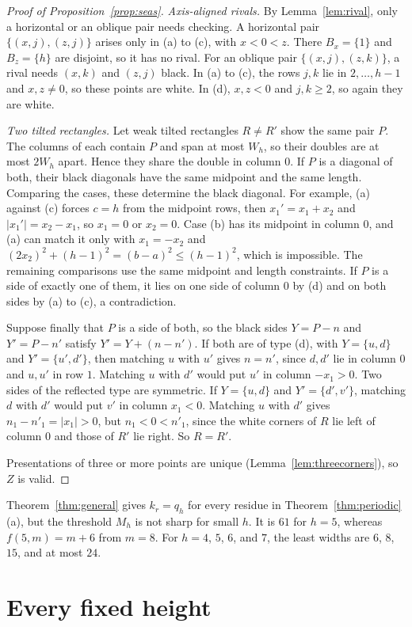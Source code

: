 \documentclass[12pt]{article}
\theoremstyle{plain}
\theoremstyle{definition}
\theoremstyle{remark}
\begin{document}
\begin{proof}[Proof of Proposition~\ref{prop:seas}]
\emph{Axis-aligned rivals.} By Lemma~\ref{lem:rival}, only a horizontal or an oblique pair needs
checking. A horizontal pair $\{(x,j),(z,j)\}$ arises only in (a) to (c), with $x<0<z$. There
$B_x=\{1\}$ and $B_z=\{h\}$ are disjoint, so it has no rival. For an oblique pair
$\{(x,j),(z,k)\}$, a rival needs $(x,k)$ and $(z,j)$ black. In (a) to (c), the rows $j,k$ lie
in $2,\dots,h-1$ and $x,z\ne0$, so these points are white. In (d), $x,z<0$ and $j,k\ge2$, so
again they are white.

\emph{Two tilted rectangles.} Let weak tilted rectangles $R\ne R'$ show the same pair $P$. The
columns of each contain $P$ and span at most $W_h$, so their doubles are at most $2W_h$ apart.
Hence they share the double in column $0$. If $P$ is a diagonal of both, their black diagonals
have the same midpoint and the same length. Comparing the cases, these determine the black
diagonal. For example, (a) against (c) forces $c=h$ from the midpoint rows, then $x_1'=x_1+x_2$
and $|x_1'|=x_2-x_1$, so $x_1=0$ or $x_2=0$. Case (b) has its midpoint in column $0$, and (a) can
match it only with $x_1=-x_2$ and $(2x_2)^2+(h-1)^2=(b-a)^2\le(h-1)^2$, which is impossible.
The remaining comparisons use the same midpoint and length constraints.
If $P$ is a side of exactly one of them, it lies on
one side of column $0$ by (d) and on both sides by (a) to (c), a contradiction.

Suppose finally that $P$ is a side of both, so the black sides $Y=P-n$ and $Y'=P-n'$ satisfy
$Y'=Y+(n-n')$. If both are of type (d), with $Y=\{u,d\}$ and $Y'=\{u',d'\}$, then matching $u$
with $u'$ gives $n=n'$, since $d,d'$ lie in column $0$ and $u,u'$ in row $1$. Matching $u$ with
$d'$ would put $u'$ in column $-x_1>0$. Two sides of the reflected type are symmetric. If
$Y=\{u,d\}$ and $Y'=\{d',v'\}$, matching $d$ with $d'$ would put $v'$ in column $x_1<0$. Matching
$u$ with $d'$ gives $n_1-n'_1=|x_1|>0$, but $n_1<0<n'_1$, since the white corners of $R$
lie left of column $0$ and those of $R'$ lie right. So $R=R'$.

Presentations of three or more points are unique (Lemma~\ref{lem:threecorners}), so $Z$ is
valid.
\end{proof}

Theorem~\ref{thm:general} gives $k_r=q_h$ for every residue in
Theorem~\ref{thm:periodic}(a), but the threshold $M_h$ is not sharp for small $h$.
It is $61$ for $h=5$, whereas $f(5,m)=m+6$ from $m=8$.
For $h=4$, $5$, $6$, and $7$, the least widths are $6$, $8$, $15$, and at most $24$.
\section{Every fixed height}\label{sec:height}
\end{document}
